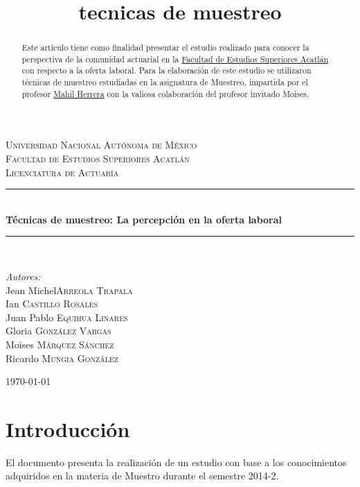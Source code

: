 \documentclass[a4paper]{article}
\title{tecnicas de muestreo}
\begin{document}
\begin{titlepage}
\newcommand{\HRule}{\rule{\linewidth}{0.5mm}}

\center 

\textsc{\LARGE Universidad Nacional Autónoma de México}\\[0.5cm]
\textsc{\Large Facultad de Estudios Superiores Acatlán}\\[0.5cm]
\textsc{\large Licenciatura de Actuaría}\\[1.5cm]

\HRule \\[0.4cm]
{ \huge \bfseries Técnicas de muestreo: La percepción en la oferta laboral}\\[0.4cm]
\HRule \\[1.5cm]

\begin{flushleft} \large
\emph{Autores:}\\
Jean Michel\textsc{Arreola Trapala}\\
Ian \textsc{Castillo Rosales}\\
Juan Pablo \textsc{Equihua Linares}\\
Gloria \textsc{González Vargas}\\
Moises \textsc{Márquez Sánchez}\\
Ricardo \textsc{Mungia González}\\[1.5cm]
\end{flushleft}

\begin{abstract}
Este artículo tiene como finalidad presentar el estudio realizado para conocer la perspectiva de la comunidad actuarial en la \href{http://www.acatlan.unam.mx/}{Facultad de Estudios Superiores Acatlán} con respecto a la oferta laboral.
Para la elaboración de este estudio se utilizaron técnicas de muestreo estudiadas en la asignatura de Muestreo, impartida por el profesor \href{http://www.sites.google.com/site/mahilhm/}{Mahil Herrera} con la valiosa colaboración del profesor invitado Moises.\\[1.5cm]
\end{abstract}

{\large \today}\\

\vfill
\end{titlepage}

\section{Introducción}
El documento presenta la realización de un estudio con base a los conocimientos adquiridos en la materia de Muestro durante el semestre 2014-2.\\
\end{document}
